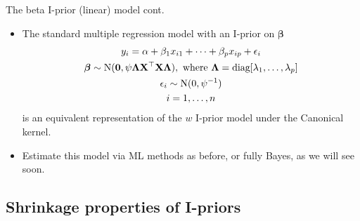 \documentclass{beamer}\usepackage[]{graphicx}\usepackage[]{color}
\newcommand{\N}{\text{\normalfont N}}
\begin{document}
\begin{frame}{The beta I-prior (linear) model cont.}
	\begin{itemize}

		\item The standard multiple regression model with an I-prior on $\boldsymbol{\beta}$
		\begin{align}\label{eq:betaiprior}
			\begin{gathered}
				y_i = \alpha + \beta_1 x_{i1} + \dots + \beta_p x_{ip} + \epsilon_i \\
				\boldsymbol\beta \sim \N(\mathbf 0, \psi\boldsymbol\Lambda \mathbf X ^\top \mathbf X \boldsymbol\Lambda), \text{ where } \boldsymbol\Lambda = \text{diag}[\lambda_1, \dots, \lambda_p]\\
				\epsilon_i \sim \text{N}(0, \psi^{-1})  \\
				i=1,\dots,n
			\end{gathered}
		\end{align}
		is an equivalent representation of the $w$ I-prior model under the Canonical kernel.

		\item Estimate this model via ML methods as before, or fully Bayes, as we will see soon.
	\end{itemize}
\end{frame}

\subsection{Shrinkage properties of I-priors}
\end{document}
